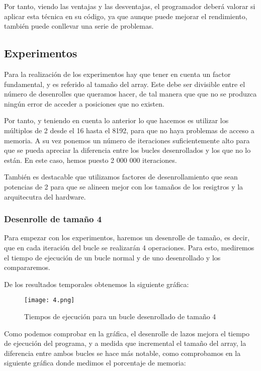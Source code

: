 \documentclass[a4paper,twocolumn]{article}
\begin{document}
Por tanto, viendo las ventajas y las desventajas, el programador deberá valorar si aplicar esta técnica en su código, ya que aunque puede mejorar el rendimiento, también puede conllevar una serie de problemas.

\subsection{Experimentos}

Para la realización de los experimentos hay que tener en cuenta un factor fundamental, y es referido al tamaño del array. Este debe ser divisible entre el número de desenrolles que queramos hacer, de tal manera que que no se produzca ningún error de acceder a posiciones que no existen.

Por tanto, y teniendo en cuenta lo anterior lo que hacemos es utilizar los múltiplos de 2 desde el 16 hasta el 8192, para que no haya problemas de acceso a memoria. A su vez ponemos un número de iteraciones suficientemente alto para que se pueda apreciar la diferencia entre los bucles desenrollados y los que no lo están. En este caso, hemos puesto 2 000 000 iteraciones.

También es destacable que utilizamos factores de desenrollamiento que sean potencias de 2 para que se alineen mejor con los tamaños de los resigtros y la arquitecutra del hardware.

\subsubsection{Desenrolle de tamaño 4}

Para empezar con los experimentos, haremos un desenrolle de tamaño, es decir, que en cada iteración del bucle se realizarán 4 operaciones. Para esto, mediremos el tiempo de ejecución de un bucle normal y de uno desenrollado y los compararemos.

De los resultados temporales obtenemos la siguiente gráfica:

\begin{figure}[H]
	\centering
	\texttt{[image: 4.png]}
	\caption{Tiempos de ejecución para un bucle desenrollado de tamaño 4}
	\label{fig:times}
\end{figure}

Como podemos comprobar en la gráfica, el desenrolle de lazos mejora el tiempo de ejecución del programa, y a medida que incremental el tamaño del array, la diferencia entre ambos bucles se hace más notable, como comprobamos en la siguiente gráfica donde medimos el porcentaje de memoria:
\end{document}
